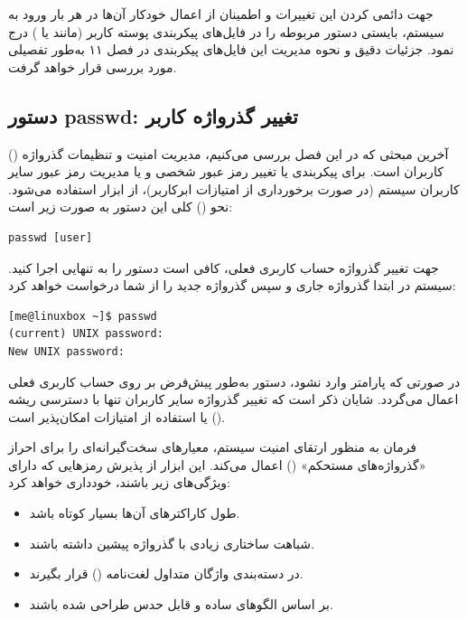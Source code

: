 جهت دائمی کردن این تغییرات و اطمینان از اعمال خودکار آن‌ها در هر بار ورود به سیستم، بایستی دستور مربوطه را در فایل‌های پیکربندی پوسته کاربر (مانند  یا ) درج نمود. جزئیات دقیق و نحوه مدیریت این فایل‌های پیکربندی در فصل ۱۱ به‌طور تفصیلی مورد بررسی قرار خواهد گرفت.

\subsection{دستور passwd: تغییر گذرواژه کاربر}

آخرین مبحثی که در این فصل بررسی می‌کنیم، مدیریت امنیت و تنظیمات گذرواژه () کاربران است. برای پیکربندی یا تغییر رمز عبور شخصی و یا مدیریت رمز عبور سایر کاربران سیستم (در صورت برخورداری از امتیازات ابرکاربر)، از ابزار  استفاده می‌شود. نحو () کلی این دستور به صورت زیر است:

\begin{latin}
\begin{lstlisting}
passwd [user]
\end{lstlisting}
\end{latin}

جهت تغییر گذرواژه حساب کاربری فعلی، کافی است دستور  را به تنهایی اجرا کنید. سیستم در ابتدا گذرواژه جاری و سپس گذرواژه جدید را از شما درخواست خواهد کرد:

\begin{latin}
\begin{lstlisting}
[me@linuxbox ~]$ passwd
(current) UNIX password:
New UNIX password:
\end{lstlisting}
\end{latin}

در صورتی که پارامتر  وارد نشود، دستور  به‌طور پیش‌فرض بر روی حساب کاربری فعلی اعمال می‌گردد. شایان ذکر است که تغییر گذرواژه سایر کاربران تنها با دسترسی ریشه () یا استفاده از امتیازات  امکان‌پذیر است.

فرمان  به منظور ارتقای امنیت سیستم، معیارهای سخت‌گیرانه‌ای را برای احراز «گذرواژه‌های مستحکم» () اعمال می‌کند. این ابزار از پذیرش رمزهایی که دارای ویژگی‌های زیر باشند، خودداری خواهد کرد:

\begin{itemize}
  \item طول کاراکترهای آن‌ها بسیار کوتاه باشد.
  \item شباهت ساختاری زیادی با گذرواژه پیشین داشته باشند.
  \item در دسته‌بندی واژگان متداول لغت‌نامه () قرار بگیرند.
  \item بر اساس الگوهای ساده و قابل حدس طراحی شده باشند.
\end{itemize}

